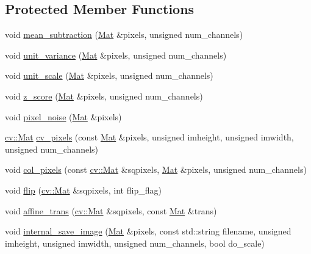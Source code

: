 \subsection*{Protected Member Functions}
\begin{DoxyCompactItemize}
\item 
void \hyperlink{classlbann_1_1lbann__image__preprocessor_ab499dd9f11d98998b5902d639f70fa8e}{mean\+\_\+subtraction} (\hyperlink{base_8hpp_a68f11fdc31b62516cb310831bbe54d73}{Mat} \&pixels, unsigned num\+\_\+channels)
\item 
void \hyperlink{classlbann_1_1lbann__image__preprocessor_af9fcb483843230008a53d60c12975f61}{unit\+\_\+variance} (\hyperlink{base_8hpp_a68f11fdc31b62516cb310831bbe54d73}{Mat} \&pixels, unsigned num\+\_\+channels)
\item 
void \hyperlink{classlbann_1_1lbann__image__preprocessor_aa7a8926d0544100f7d3caa9289d94826}{unit\+\_\+scale} (\hyperlink{base_8hpp_a68f11fdc31b62516cb310831bbe54d73}{Mat} \&pixels, unsigned num\+\_\+channels)
\item 
void \hyperlink{classlbann_1_1lbann__image__preprocessor_aec67fb0dc7a1f5d718d5bb2e226f9b7a}{z\+\_\+score} (\hyperlink{base_8hpp_a68f11fdc31b62516cb310831bbe54d73}{Mat} \&pixels, unsigned num\+\_\+channels)
\item 
void \hyperlink{classlbann_1_1lbann__image__preprocessor_aece5b572d0a2fe123cc66412d7a5c91e}{pixel\+\_\+noise} (\hyperlink{base_8hpp_a68f11fdc31b62516cb310831bbe54d73}{Mat} \&pixels)
\item 
\hyperlink{base_8hpp_a68f11fdc31b62516cb310831bbe54d73}{cv\+::\+Mat} \hyperlink{classlbann_1_1lbann__image__preprocessor_a7dc609e33febdc7fc29bdc9270594bea}{cv\+\_\+pixels} (const \hyperlink{base_8hpp_a68f11fdc31b62516cb310831bbe54d73}{Mat} \&pixels, unsigned imheight, unsigned imwidth, unsigned num\+\_\+channels)
\item 
void \hyperlink{classlbann_1_1lbann__image__preprocessor_a3e99be32b95a415fd8d616cb85075df1}{col\+\_\+pixels} (const \hyperlink{base_8hpp_a68f11fdc31b62516cb310831bbe54d73}{cv\+::\+Mat} \&sqpixels, \hyperlink{base_8hpp_a68f11fdc31b62516cb310831bbe54d73}{Mat} \&pixels, unsigned num\+\_\+channels)
\item 
void \hyperlink{classlbann_1_1lbann__image__preprocessor_a12d9f7056a5e68185ea0e85e14c17bcf}{flip} (\hyperlink{base_8hpp_a68f11fdc31b62516cb310831bbe54d73}{cv\+::\+Mat} \&sqpixels, int flip\+\_\+flag)
\item 
void \hyperlink{classlbann_1_1lbann__image__preprocessor_adb9e017aeac52a9b5d392f17188d1057}{affine\+\_\+trans} (\hyperlink{base_8hpp_a68f11fdc31b62516cb310831bbe54d73}{cv\+::\+Mat} \&sqpixels, const \hyperlink{base_8hpp_a68f11fdc31b62516cb310831bbe54d73}{Mat} \&trans)
\item 
void \hyperlink{classlbann_1_1lbann__image__preprocessor_a3c4f4cc5c90233696566a35a62a1708c}{internal\+\_\+save\+\_\+image} (\hyperlink{base_8hpp_a68f11fdc31b62516cb310831bbe54d73}{Mat} \&pixels, const std\+::string filename, unsigned imheight, unsigned imwidth, unsigned num\+\_\+channels, bool do\+\_\+scale)
\end{DoxyCompactItemize}
